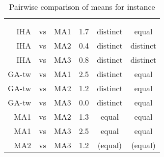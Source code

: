 \documentclass[thesis.tex]{subfiles}
\newcommand{\CurrentInstance}{}
\newcommand{\CurrentInstanceFileEscaped}{}
\begin{document}
\begin{table}[htbp]
   \caption{Pairwise comparison of means for instance \CurrentInstance}
   \label{fig:\CurrentInstanceFileEscaped-mannwhitneyu}
   \centering\small
      \begin{tabular}{r@{\ }c@{\ }l S[table-format=2.2] c c} \toprule
         &&&                          &  \\ \cmidrule(lr){5-6}
         &&&  &  &  \\ \midrule

         \gls{IHA} &vs& \gls{MA1}   &  1.7  & distinct &  equal   \\
         \gls{IHA} &vs& \gls{MA2}   &  0.4  & distinct & distinct \\
         \gls{IHA} &vs& \gls{MA3}   &  0.8  & distinct & distinct \\
         \gls{GA-tw} &vs& \gls{MA1} &  2.5  & distinct &  equal   \\
         \gls{GA-tw} &vs& \gls{MA2} &  1.2  & distinct &  equal   \\
         \gls{GA-tw} &vs& \gls{MA3} &  0.0  & distinct &  equal   \\
         \gls{MA1} &vs& \gls{MA2}   &  1.3  &  equal   &  equal   \\
         \gls{MA1} &vs& \gls{MA3}   &  2.5  &  equal   &  equal   \\
         \gls{MA2} &vs& \gls{MA3}   &  1.2  & (equal)  & (equal)  \\
         \bottomrule
      \end{tabular}
\end{table}
\end{document}
